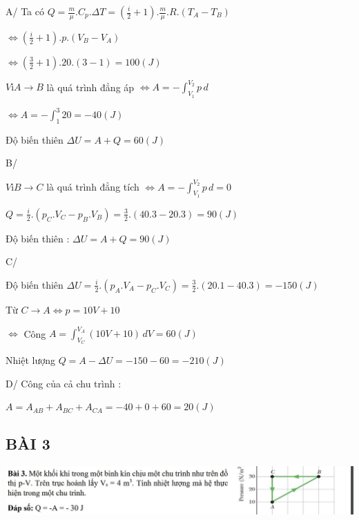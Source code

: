 \documentclass[12pt,a4paper]{article}
\begin{document}
\vspace*{1cm}
A/ Ta có $Q = \frac{m}{\mu}.C_p.\Delta T = (\frac{i}{2} + 1).\frac{m}{\mu}.R.(T_A - T_B) $

\vspace*{1cm}
$\Leftrightarrow (\frac{i}{2}+1).p.(V_B - V_A)$

\vspace*{1cm}
$\Leftrightarrow (\frac{3}{2}+1).20.(3-1) = 100 (J)$

\vspace*{1cm}
$Vì A \rightarrow B $ là quá trình đẳng áp $ \Leftrightarrow  A = - \int_{V_1}^{V_2} p \,d $

\vspace*{1cm}
$\Leftrightarrow A = - \int_{1}^{3} 20 = - 40 (J) $

\vspace*{1cm}
Độ biến thiên $\Delta U = A + Q = 60 (J)$

\vspace*{1cm}
B/

$Vì B \rightarrow C $ là quá trình đẳng tích $ \Leftrightarrow  A = - \int_{V_1}^{V_2} p \,d = 0$

\vspace*{1cm}
$Q = \frac{i}{2}.(p_C.V_C - p_B.V_B) = \frac{3}{2}.(40.3 - 20.3) = 90 (J)$

\vspace*{1cm}
Độ biến thiên : $\Delta U = A + Q = 90 (J)$

\vspace*{1cm}
C/

\vspace*{1cm}
Độ biến thiên $\Delta U = \frac{i}{2}.(p_A.V_A - p_C.V_C) = \frac{3}{2}.(20.1 - 40.3) = -150 (J)$

\vspace*{1cm}
Từ $C \rightarrow A \Leftrightarrow p = 10V + 10$

\vspace*{1cm}
$\Leftrightarrow$ Công $ A = \int_{V_C}^{V_A} (10V + 10) \,dV = 60 (J)$

\vspace*{1cm}
Nhiệt lượng $Q = A - \Delta U = -150 - 60 = -210 (J)$

\vspace*{1cm}
D/ Công của cả chu trình : 

\vspace*{1cm} 
$A = A_{AB} + A_{BC} + A_{CA} = -40 + 0 + 60 = 20 (J)$

\Large \subsection{\color{blue}\textbf{BÀI 3} }
\includegraphics[scale=1]{No.3.jpg}
\end{document}

